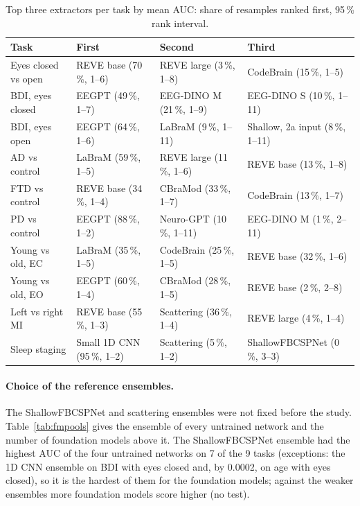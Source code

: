 \documentclass[11pt]{article}
\begin{document}
\begin{table}[h]
\centering\footnotesize\setlength{\tabcolsep}{3pt}
\caption{Top three extractors per task by mean AUC: share of resamples ranked first, 95\,\% rank
interval.}
\label{tab:ranks}
\begin{tabular}{@{}llll@{}}
\toprule
Task & First & Second & Third \\
\midrule
Eyes closed vs open & REVE base (70\,\%, 1--6) & REVE large (3\,\%, 1--8) & CodeBrain (15\,\%, 1--5) \\
BDI, eyes closed & EEGPT (49\,\%, 1--7) & EEG-DINO M (21\,\%, 1--9) & EEG-DINO S (10\,\%, 1--11) \\
BDI, eyes open & EEGPT (64\,\%, 1--6) & LaBraM (9\,\%, 1--11) & Shallow, 2a input (8\,\%, 1--11) \\
AD vs control & LaBraM (59\,\%, 1--5) & REVE large (11\,\%, 1--6) & REVE base (13\,\%, 1--8) \\
FTD vs control & REVE base (34\,\%, 1--4) & CBraMod (33\,\%, 1--7) & CodeBrain (13\,\%, 1--7) \\
PD vs control & EEGPT (88\,\%, 1--2) & Neuro-GPT (10\,\%, 1--11) & EEG-DINO M (1\,\%, 2--11) \\
Young vs old, EC & LaBraM (35\,\%, 1--5) & CodeBrain (25\,\%, 1--5) & REVE base (32\,\%, 1--6) \\
Young vs old, EO & EEGPT (60\,\%, 1--4) & CBraMod (28\,\%, 1--5) & REVE base (2\,\%, 2--8) \\
Left vs right MI & REVE base (55\,\%, 1--3) & Scattering (36\,\%, 1--4) & REVE large (4\,\%, 1--4) \\
Sleep staging & Small 1D CNN (95\,\%, 1--2) & Scattering (5\,\%, 1--2) & ShallowFBCSPNet (0\,\%, 3--3) \\
\bottomrule
\end{tabular}
\end{table}

\paragraph{Choice of the reference ensembles.} The ShallowFBCSPNet and scattering ensembles were
not fixed before the study. Table~\ref{tab:fmpools} gives the ensemble of every untrained network
and the number of foundation models above it. The ShallowFBCSPNet ensemble had the highest AUC of
the four untrained networks on 7 of the 9 tasks (exceptions: the 1D CNN ensemble on BDI with eyes closed and, by 0.0002,
on age with eyes closed), so it is the hardest of them for the foundation
models; against the weaker ensembles more foundation models score higher (no test).
\end{document}
